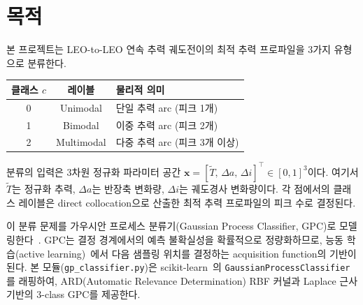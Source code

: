 \documentclass[11pt]{article}
\begin{document}
\drawborder
\thispagestyle{firstpage}

\def\lighterdate{February 12, 2026}

\begin{abstract}
본 프로젝트는 LEO-to-LEO 연속 추력 궤도전이의 최적 추력 프로파일을 3가지 유형(unimodal, bimodal, multimodal)으로 분류한다.
분류의 입력은 3차원 정규화 파라미터 공간 $\mathbf{x} = [\tilde{T},\, \Delta a,\, \Delta i]^\top \in [0,1]^3$이며,
각 점에서의 클래스 레이블은 direct collocation으로 산출한 최적 추력 프로파일의 피크 수로 결정된다.
이 분류 문제를 가우시안 프로세스 분류기(GPC)로 모델링한다.
GPC는 결정 경계에서의 예측 불확실성을 확률적으로 정량화하므로,
능동 학습에서 다음 샘플링 위치를 결정하는 acquisition function의 기반이 된다.
본 모듈(\texttt{gp\_classifier.py})은 scikit-learn의 \texttt{GaussianProcessClassifier}를 래핑하여,
ARD RBF 커널과 Laplace 근사 기반의 3-class GPC를 제공한다.
\end{abstract}


\section{목적}

본 프로젝트는 LEO-to-LEO 연속 추력 궤도전이의 최적 추력 프로파일을 3가지 유형으로 분류한다.

\begin{table}[h]
\centering
\begin{tabular}{ccl}
\toprule
클래스 $c$ & 레이블 & 물리적 의미 \\
\midrule
0 & Unimodal & 단일 추력 arc (피크 1개) \\
1 & Bimodal & 이중 추력 arc (피크 2개) \\
2 & Multimodal & 다중 추력 arc (피크 3개 이상) \\
\bottomrule
\end{tabular}
\end{table}

분류의 입력은 3차원 정규화 파라미터 공간 $\mathbf{x} = [\tilde{T},\, \Delta a,\, \Delta i]^\top \in [0,1]^3$이다.
여기서 $\tilde{T}$는 정규화 추력, $\Delta a$는 반장축 변화량, $\Delta i$는 궤도경사 변화량이다.
각 점에서의 클래스 레이블은 direct collocation으로 산출한 최적 추력 프로파일의 피크 수로 결정된다.

이 분류 문제를 가우시안 프로세스 분류기(Gaussian Process Classifier, GPC)로 모델링한다~\cite{Rasmussen2006}.
GPC는 결정 경계에서의 예측 불확실성을 확률적으로 정량화하므로,
능동 학습(active learning)~\cite{Settles2009}에서 다음 샘플링 위치를 결정하는 acquisition function의 기반이 된다.
본 모듈(\texttt{gp\_classifier.py})은 scikit-learn~\cite{Pedregosa2011}의 \texttt{GaussianProcessClassifier}를 래핑하여,
ARD(Automatic Relevance Determination) RBF 커널과 Laplace 근사 기반의 3-class GPC를 제공한다.
\end{document}
